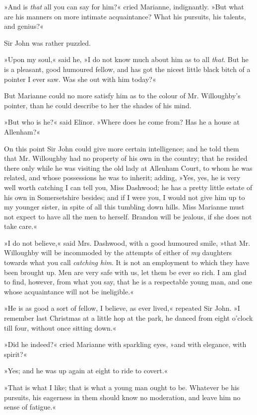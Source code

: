 »And is \textit{that} all you can say for him?« cried Marianne, indignantly. »But what are his manners on more intimate acquaintance? What his pursuits, his talents, and genius?«

Sir John was rather puzzled.

»Upon my soul,« said he, »I do not know much about him as to all \textit{that}. But he is a pleasant, good humoured fellow, and has got the nicest little black bitch of a pointer I ever saw. Was she out with him today?«

But Marianne could no more satisfy him as to the colour of Mr. Willoughby’s pointer, than he could describe to her the shades of his mind.

»But who is he?« said Elinor. »Where does he come from? Has he a house at Allenham?«

On this point Sir John could give more certain intelligence; and he told them that Mr. Willoughby had no property of his own in the country; that he resided there only while he was visiting the old lady at Allenham Court, to whom he was related, and whose possessions he was to inherit; adding, »Yes, yes, he is very well worth catching I can tell you, Miss Dashwood; he has a pretty little estate of his own in Somersetshire besides; and if I were you, I would not give him up to my younger sister, in spite of all this tumbling down hills. Miss Marianne must not expect to have all the men to herself. Brandon will be jealous, if she does not take care.«

»I do not believe,« said Mrs. Dashwood, with a good humoured smile, »that Mr. Willoughby will be incommoded by the attempts of either of \textit{my} daughters towards what you call \textit{catching him}. It is not an employment to which they have been brought up. Men are very safe with us, let them be ever so rich. I am glad to find, however, from what you say, that he is a respectable young man, and one whose acquaintance will not be ineligible.«

»He is as good a sort of fellow, I believe, as ever lived,« repeated Sir John. »I remember last Christmas at a little hop at the park, he danced from eight o’clock till four, without once sitting down.«

»Did he indeed?« cried Marianne with sparkling eyes, »and with elegance, with spirit?«

»Yes; and he was up again at eight to ride to covert.«

»That is what I like; that is what a young man ought to be. Whatever be his pursuits, his eagerness in them should know no moderation, and leave him no sense of fatigue.«

